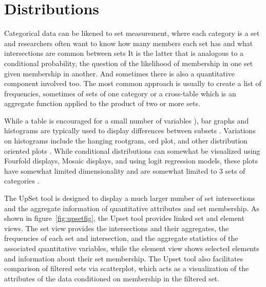 \documentclass[../main.tex]{subfiles}
\begin{document}
\section{Distributions}

Categorical data can be likened to set measurement, where each category is a set
and researchers often want to know how many members each set has and what
intersections are common between sets \cite{agresti_categorical_2011,schneider_set-theoretic_2012}
  It is the latter that is analogous to a
conditional probability, the question of the likelihood of membership in one
set given membership in another. And sometimes there is also a quantitative
component involved too. The most common approach is usually to create a list of frequencies, sometimes of sets of one category or a cross-table\cite{goodman_measures_1991} which is an aggregate function applied to the product of two or more sets.

 While a table is encouraged for a small number of variables
 \cite{munzner_what:_2014}), bar graphs and histograms are typically used to display differences between subsets \cite{ioannidis_history_2003-1, friendly_brief_2006}. Variations on histograms
 include the hanging rootgram, ord plot, and other distribution oriented
 plots \cite{tukey_exploratory_1977, friendly_visualizing_2000}. While conditional  distributions can somewhat be visualized using Fourfold displays, Mosaic displays, and using logit regression models, these plots have somewhat limited dimensionality and are somewhat limited to 3 sets of categories
 \cite{friendly_visualizing_2000}. 
   
 

The UpSet tool is designed to
display a much larger number of set intersections and the aggregate
information of quantitative attributes and set membership. \cite{lex_upset:_2014}
As shown in figure~\ref{fig:upsetfig}, the Upset tool provides linked set and element views. The set view provides the intersections and their
aggregates, the frequencies of each set and intersection, and the aggregate
statistics of the associated quantitative variables, while the element view shows
selected elements and information about their set membership. The Upset tool
also facilitates comparison of filtered sets via scatterplot, which acts as a
visualization of the attributes of the data conditioned on membership in the
filtered set.  
\end{document}
